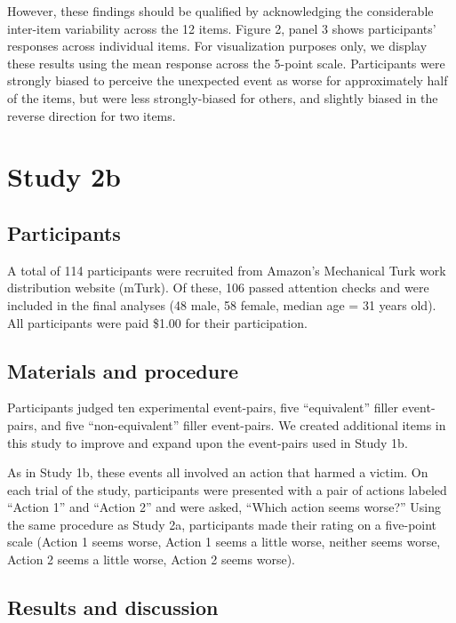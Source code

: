 \documentclass[10pt, letterpaper]{article}
\begin{document}
However, these findings should be qualified by acknowledging the
considerable inter-item variability across the 12 items. Figure 2, panel
3 shows participants' responses across individual items. For
visualization purposes only, we display these results using the mean
response across the 5-point scale. Participants were strongly biased to
perceive the unexpected event as worse for approximately half of the
items, but were less strongly-biased for others, and slightly biased in
the reverse direction for two items.

\section{Study 2b}\label{study-2b}

\subsection{Participants}\label{participants-3}

A total of 114 participants were recruited from Amazon's Mechanical Turk
work distribution website (mTurk). Of these, 106 passed attention checks
and were included in the final analyses (48 male, 58 female, median age
= 31 years old). All participants were paid \$1.00 for their
participation.

\subsection{Materials and procedure}\label{materials-and-procedure-3}

Participants judged ten experimental event-pairs, five ``equivalent''
filler event-pairs, and five ``non-equivalent'' filler event-pairs. We
created additional items in this study to improve and expand upon the
event-pairs used in Study 1b.

As in Study 1b, these events all involved an action that harmed a
victim. On each trial of the study, participants were presented with a
pair of actions labeled ``Action 1'' and ``Action 2'' and were asked,
``Which action seems worse?'' Using the same procedure as Study 2a,
participants made their rating on a five-point scale (Action 1 seems
worse, Action 1 seems a little worse, neither seems worse, Action 2
seems a little worse, Action 2 seems worse).

\subsection{Results and discussion}\label{results-and-discussion-3}
\end{document}
